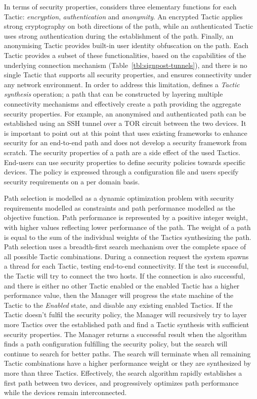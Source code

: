 In terms of security properties, \signpost considers three elementary
functions for each Tactic: \textit{encryption}, \textit{authentication}
and \textit{anonymity}.  An encrypted Tactic applies strong cryptography on both
directions of the path, while an authenticated Tactic uses strong authentication
during the establishment of the path.  Finally, an anonymising Tactic provides
built-in user identity obfuscation on the path.  Each Tactic provides a subset
of these functionalities, based on the capabilities of the underlying connection
mechanism (Table~\ref{tbl:signpost-tunnels}), and there is no single Tactic
that supports all security properties, and ensures connectivity under any network
environment. In order to address this limitation, \signpost defines a
\textit{Tactic synthesis} operation; a path that can be constructed by layering
multiple connectivity mechanisms and effectively create a path providing the
aggregate security properties. For example, an anonymised and authenticated path can
be established using an SSH tunnel over a TOR circuit between the two devices.
It is important to point out at this point that \signpost uses existing
frameworks to enhance security for an end-to-end path and does not develop a
security framework from scratch. The security properties of a path are a side
effect of the used Tactics.  End-users can use security properties to define
security policies towards specific devices. The policy is expressed through a
configuration file and users specify security requirements on a per domain
basis. 

Path selection is modelled as a dynamic optimization problem with security
requirements modelled as constraints and path performance modelled as the
objective function.  Path performance is represented by a positive integer
weight, with higher values reflecting lower performance of the path. The weight
of a path is equal to the sum of the individual weights of the Tactics
synthesizing the path.  Path selection uses a breadth-first search mechanism
over the complete space of all possible Tactic combinations.  During a
connection request the system spawns a thread for each Tactic, testing
end-to-end connectivity.  If the test is successful, the Tactic will try to
connect the two hosts. If the connection is also successful, and there is either
no other Tactic enabled or the enabled Tactic has a higher performance value,
then the Manager will progress the state machine of the Tactic to the
\emph{Enabled} state, and disable any existing enabled Tactics. If the Tactic
doesn't fulfil the security policy, the Manager will recursively try to layer
more Tactics over the established path and find a Tactic synthesis with
sufficient security properties. The Manager returns a successful result when the
algorithm finds a path configuration fulfilling the security policy, but the
search will continue to search for better paths.  The search will terminate when
all remaining Tactic combinations have a higher performance weight or they are
synthesized by more than three Tactics.  Effectively, the search algorithm
rapidly establishes a first path between two devices, and progressively optimizes
path performance while the devices remain interconnected. 

